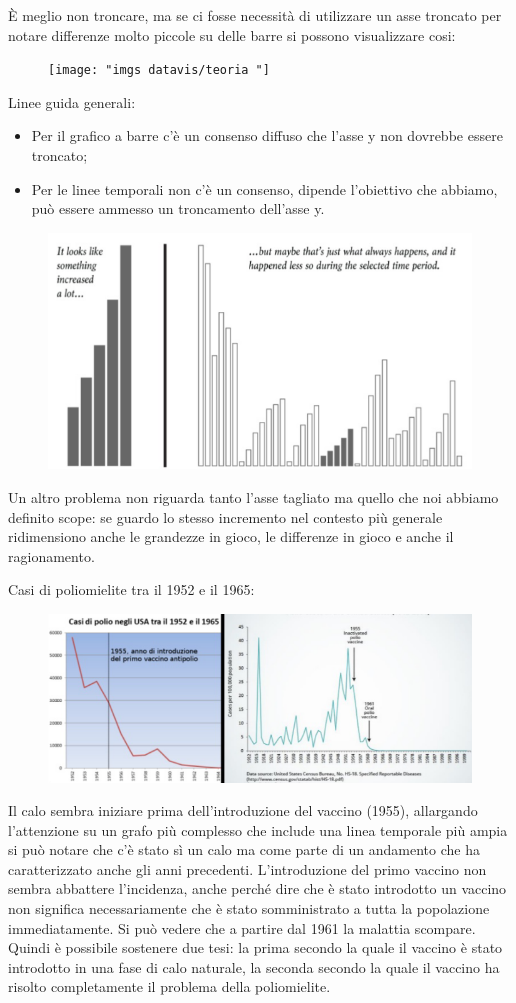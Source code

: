 \documentclass[12pt,a4paper]{report}
\begin{document}
È meglio non troncare, ma se ci fosse necessità di utilizzare un asse troncato per notare differenze molto piccole su delle barre si possono visualizzare cosi:

\begin{figure}[h]
	\centering
	\texttt{[image: "imgs datavis/teoria "]}
	\caption{}
	\label{fig:teoria-}
\end{figure}

Linee guida generali: 
\begin{itemize}
	\item Per il grafico a barre c'è un consenso diffuso che l'asse y non dovrebbe essere troncato; 
	\item Per le linee temporali non c'è un consenso, dipende l'obiettivo che abbiamo, può essere ammesso un troncamento dell'asse y. 
\end{itemize}


\begin{figure}[h]
	\centering
	\includegraphics[width=0.5\linewidth]{"imgs datavis/23"}
	\caption{}
	\label{fig:23}
\end{figure}


Un altro problema non riguarda tanto l'asse tagliato ma quello che noi abbiamo definito scope: se guardo lo stesso incremento nel contesto più generale ridimensiono anche le grandezze in gioco, le differenze in gioco e anche il ragionamento. 

\newpage
Casi di poliomielite tra il 1952 e il 1965:

\begin{figure}[h]
	\centering
	\includegraphics[width=0.5\linewidth]{"imgs datavis/2"}
	\caption{}
	\label{fig:2}
\end{figure}

Il calo sembra iniziare prima dell'introduzione del vaccino (1955), allargando l’attenzione su un grafo più complesso che include una linea temporale più ampia si può notare che c'è stato sì un calo ma come parte di un andamento che ha caratterizzato anche gli anni precedenti. L'introduzione del primo vaccino non sembra abbattere l'incidenza, anche perché dire che è stato introdotto un vaccino non significa necessariamente che è stato somministrato a tutta la popolazione immediatamente. Si può vedere che a partire dal 1961 la malattia scompare. Quindi è possibile sostenere due tesi: la prima secondo la quale il vaccino è stato introdotto in una fase di calo naturale, la seconda secondo la quale il vaccino ha risolto completamente il problema della poliomielite. 
\end{document}
